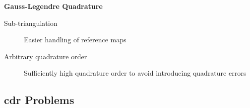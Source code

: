 \begin{frame}
    \begin{center}
        {\color{\accentcolor} \Large \textbf{Gauss-Legendre Quadrature}}
    \end{center}

    \begin{center}
        \begin{minipage}{0.75\textwidth}
            \begin{description}
                \item[Sub-triangulation] Easier handling of reference maps
                \item[Arbitrary quadrature order] Sufficiently high quadrature order to avoid introducing quadrature errors
            \end{description}
        \end{minipage}
    \end{center}
    \vspace*{\fill}
    
\end{frame}

\subsection{\texorpdfstring{\acrshort{cdr}}{} Problems}


